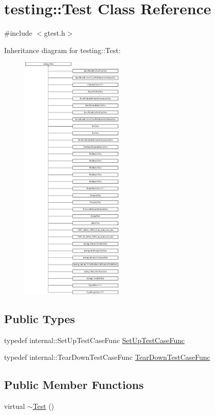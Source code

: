 \hypertarget{classtesting_1_1_test}{}\section{testing\+:\+:Test Class Reference}
\label{classtesting_1_1_test}


{\ttfamily \#include $<$gtest.\+h$>$}

Inheritance diagram for testing\+:\+:Test\+:\begin{figure}[H]
\begin{center}
\leavevmode
\includegraphics[height=12.000000cm]{classtesting_1_1_test}
\end{center}
\end{figure}
\subsection*{Public Types}
\begin{DoxyCompactItemize}
\item 
typedef internal\+::\+Set\+Up\+Test\+Case\+Func \hyperlink{classtesting_1_1_test_a5f2a051d1d99c9b784c666c586186cf9}{Set\+Up\+Test\+Case\+Func}
\item 
typedef internal\+::\+Tear\+Down\+Test\+Case\+Func \hyperlink{classtesting_1_1_test_aa0f532e93b9f3500144c53f31466976c}{Tear\+Down\+Test\+Case\+Func}
\end{DoxyCompactItemize}
\subsection*{Public Member Functions}
\begin{DoxyCompactItemize}
\item 
virtual \hyperlink{classtesting_1_1_test_a2b0a62f1e667bbe8d8cb18d785bfa991}{$\sim$\+Test} ()
\end{DoxyCompactItemize}
